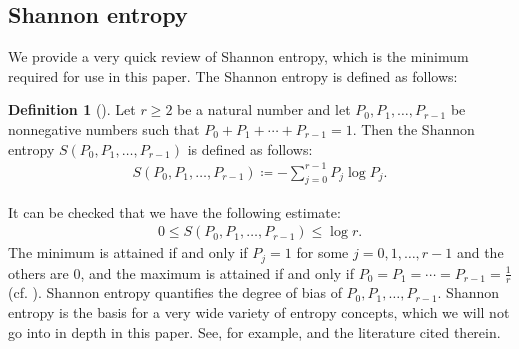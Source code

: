 \documentclass[12pt]{article}
\theoremstyle{definition}
\newtheorem{defi}{Definition}%
\begin{document}
\subsection{Shannon entropy}\label{Shannon}
We provide a very quick review of Shannon entropy, which is the minimum required for use in this paper. The Shannon entropy is defined as follows:
\begin{defi}[\cite{Sh1}] 
Let $r\geq 2$ be a natural number and let $P_0,P_1,\dots, P_{r-1}$ be nonnegative numbers such that $P_0+P_1+\cdots+ P_{r-1}=1$. Then the Shannon entropy $S(P_0,P_1, \dots, P_{r-1})$ is defined as follows:
\begin{align*}
S(P_0, P_1,\dots, P_{r-1})\coloneqq -\sum_{j=0}^{r-1} P_j \log P_j.
\end{align*}
\end{defi}
It can be checked that we have the following estimate:
\begin{align*}
0\leq S(P_0,P_1,\dots, P_{r-1})\leq \log r.
\end{align*}
The minimum is attained if and only if $P_j=1$ for some $j=0,1,\dots,{r-1}$ and the others are 0, and the maximum is attained if and only if $P_0=P_1=\cdots =P_{r-1}=\frac{1}{r}$ (cf. \cite{Lei1, PW1, Sh1}). Shannon entropy quantifies the degree of bias of $P_0,P_1,\dots, P_{r-1}$. Shannon entropy is the basis for a very wide variety of entropy concepts, which we will not go into in depth in this paper. See, for example, \cite{KH1, Lei1, PW1} and the literature cited therein.
\end{document}
